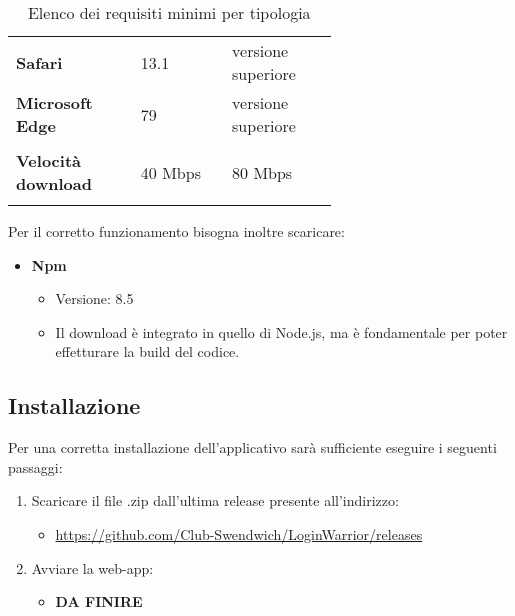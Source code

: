 {\begin{longtable}{>{\raggedright\arraybackslash}m{0.24\linewidth}m{0.20\linewidth}m{0.20\linewidth}}
    \rowcolor[RGB]{216, 235, 171}
    \textbf{Safari} & 13.1 & versione superiore \\

    \rowcolor[RGB]{233, 245, 206}
    \textbf{Microsoft Edge} & 79 & versione superiore \\

    \rowcolor[RGB]{47, 106, 73}
    \multicolumn{3}{>{\centering\arraybackslash}m{0.693\linewidth}}{\textcolor{white}{\textbf{Connessione}}}\\

    \rowcolor[RGB]{216, 235, 171}
    \textbf{Velocità download} & 40 Mbps & 80 Mbps \\
    
    \caption{Elenco dei requisiti minimi per tipologia}
\end{longtable}
}

Per il corretto funzionamento bisogna inoltre scaricare:
\begin{itemize}
    \item \textbf{Npm}
    \begin{itemize}
        \item Versione: 8.5
        \item Il download è integrato in quello di Node.js, ma è fondamentale per poter effetturare la build del codice.
    \end{itemize}
\end{itemize}

\subsection{Installazione}

Per una corretta installazione dell'applicativo sarà sufficiente eseguire i seguenti passaggi:

\begin{enumerate}
    \item Scaricare il file .zip dall'ultima release presente all'indirizzo:
    \begin{itemize}
        \item \href{https://github.com/Club-Swendwich/LoginWarrior/releases}{https://github.com/Club-Swendwich/LoginWarrior/releases}
    \end{itemize}
    \item Avviare la web-app:
    \begin{itemize}
        \item \textbf{DA FINIRE}
    \end{itemize}
\end{enumerate}
